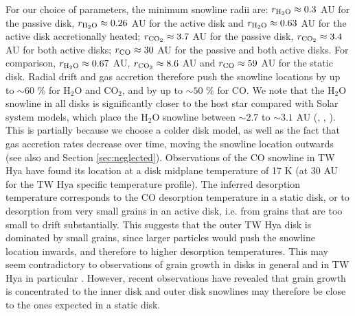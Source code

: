 \documentclass[apj]{emulateapj}
\newcommand{\emgr}[1]{\emph{ \color{gray} #1}}
\begin{document}
For our choice of parameters, the minimum snowline radii are: $r_{\rm{H_2O}} \approx 0.3$ AU for the passive disk, $r_{\rm{H_2O}} \approx 0.26$ AU for the active disk and $r_{\rm{H_2O}} \approx 0.63$ AU for the active disk accretionally heated; $r_{\rm{CO_2}} \approx 3.7$ AU for the passive disk, $r_{\rm{CO_2}} \approx 3.4$ AU for both active disks; $r_{\rm{CO}} \approx 30$ AU for the passive and both active disks. For comparison, $r_{\rm{H_2O}} \approx 0.67$ AU, $r_{\rm{CO_2}} \approx 8.6$ AU and $r_{\rm{CO}} \approx 59$ AU for the static disk. Radial drift and gas accretion therefore push the snowline locations by up to $\sim$$60$ \% for H$_2$O and CO$_2$, and by up to $\sim$$50$ \% for CO.  We note that the H$_2$O snowline in all disks is significantly closer to the host star compared with Solar system models, which place the H$_2$O snowline between $\sim$$2.7$ to $\sim$$3.1$ AU (\citealt{hayashi81}, \citealt{podolak04}, \citealt{martin12}). This is partially because we choose a colder disk model, as well as the fact that gas accretion rates decrease over time, moving the snowline location outwards (see also \citealt{garaud07} and Section \ref{sec:neglected}). Observations of the CO snowline in TW Hya \citep{qi13} have found its location at a disk midplane temperature of 17 K (at 30 AU for the TW Hya specific temperature profile). The inferred  desorption temperature corresponds to the CO desorption temperature in a static disk, or to desorption from very small grains in an active disk, i.e. from grains that are too small to drift substantially. This suggests that the outer TW Hya disk is dominated by small grains, since larger particles would push the snowline location inwards, and therefore to higher desorption temperatures. This may seem contradictory to observations of grain growth in disks in general and in TW Hya in particular \citep{wilner00}. However, recent observations have revealed that grain growth is concentrated to the inner disk \citep{perez12} and outer disk snowlines may therefore be close to the ones expected in a static disk.







\end{document}

